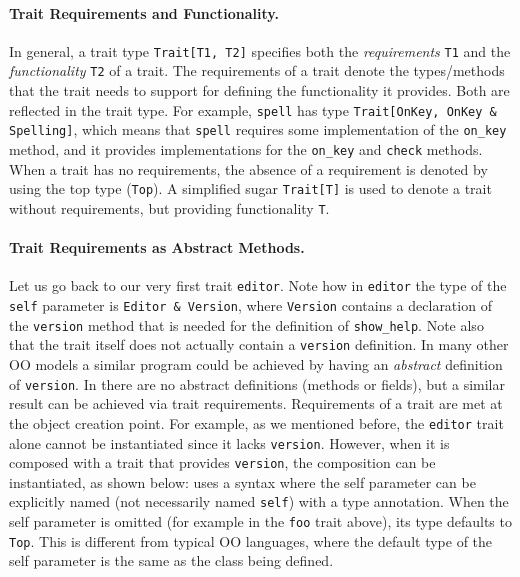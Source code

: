 \paragraph{Trait Requirements and Functionality.}
In general, a trait type
\lstinline{Trait[T1, T2]} specifies both the \emph{requirements} \lstinline{T1}
and the \emph{functionality} \lstinline{T2} of a trait. The requirements of a trait denote the types/methods that the
trait needs to support for defining the functionality it provides. Both are
reflected in the trait type. For example, \lstinline{spell} has type
\lstinline{Trait[OnKey, OnKey & Spelling]}, which means that \lstinline{spell}
requires some implementation of the \lstinline{on_key} method, and it provides
implementations for the \lstinline{on_key} and \lstinline{check} methods.
When a trait
has no requirements, the absence of a requirement is denoted by using
the top type (\lstinline{Top}). A simplified sugar \lstinline{Trait[T]} is
used to denote a trait without requirements, but providing functionality \lstinline{T}.

\paragraph{Trait Requirements as Abstract Methods.}
Let us go back to our very first trait \lstinline{editor}. Note how in
\lstinline{editor} the type of the \lstinline{self} parameter is
\lstinline{Editor & Version}, where \lstinline{Version} contains a declaration of the
\lstinline{version} method that is needed for the definition of
\lstinline{show_help}. Note also that the trait itself does not actually contain
a \lstinline{version} definition. In many other OO models a similar program
could be achieved by having an \emph{abstract} definition of
\lstinline{version}. In \name there are no abstract definitions (methods or
fields), but a similar result can be achieved via trait requirements.
Requirements of a trait are met at the object creation point. For example, as we
mentioned before, the \lstinline{editor} trait alone cannot be instantiated
since it lacks \lstinline{version}. However, when it is composed with a trait that
provides \lstinline{version}, the composition can be instantiated, as shown below:
\name uses a syntax where the self parameter
can be explicitly named (not necessarily named \lstinline{self}) with a
type annotation. When the self parameter is omitted (for example in the
\lstinline{foo} trait above), its type defaults to \lstinline{Top}. This
is different from typical OO languages, where the default type of the self
parameter is the same as the class being defined.



